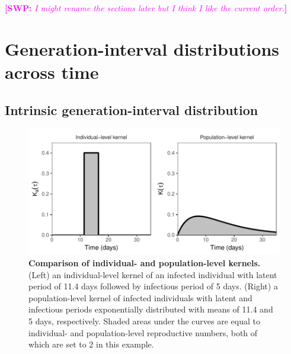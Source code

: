\documentclass[12pt]{article}
\newcommand{\comment}[3]{\textcolor{#1}{\textbf{[#2: }\textsl{#3}\textbf{]}}}
\newcommand{\swp}[1]{\comment{magenta}{SWP}{#1}}
\begin{document}
\swp{I might rename the sections later but I think I like the current order.}
\section{Generation-interval distributions across time}

\subsection{Intrinsic generation-interval distribution}

\begin{figure}[t]
\includegraphics[width=\textwidth]{../fig/individual_and_population.pdf}
\caption{\textbf{Comparison of individual- and population-level kernels.}
(Left) an individual-level kernel of an infected individual with latent period of 11.4 days followed by infectious period of 5 days. 
(Right) a population-level kernel of infected individuals with latent and infectious periods exponentially distributed with means of 11.4 and 5 days, respectively. 
Shaded areas under the curves are equal to individual- and population-level reproductive numbers, both of which are set to 2 in this example.
}
\label{fig:indpop}

\end{figure}
\end{document}
